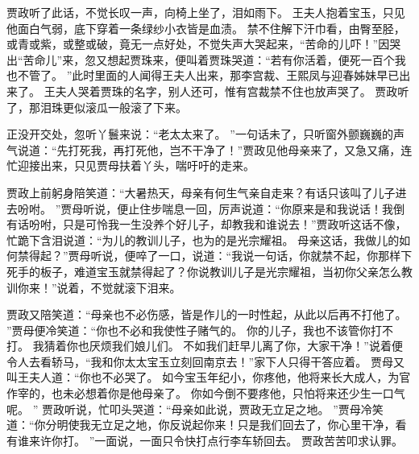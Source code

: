 贾政听了此话，不觉长叹一声，向椅上坐了，泪如雨下。
王夫人抱着宝玉，只见他面白气弱，底下穿着一条绿纱小衣皆是血渍。
禁不住解下汗巾看，由臀至胫，
或青或紫，或整或破，竟无一点好处，不觉失声大哭起来，“苦命的儿吓！”因哭出“苦命儿”来，忽又想起贾珠来，便叫着贾珠哭道：“若有你活着，便死一百个我也不管了。
”此时里面的人闻得王夫人出来，那李宫裁、王熙凤与迎春姊妹早已出来了。
王夫人哭着贾珠的名字，别人还可，惟有宫裁禁不住也放声哭了。
贾政听了，那泪珠更似滚瓜一般滚了下来。
\par
正没开交处，忽听丫鬟来说：“老太太来了。
”一句话未了，只听窗外颤巍巍的声气说道：“先打死我，再打死他，岂不干净了！”贾政见他母亲来了，又急又痛，连忙迎接出来，只见贾母扶着丫头，喘吁吁的走来。
\par
贾政上前躬身陪笑道：“大暑热天，母亲有何生气亲自走来？有话只该叫了儿子进去吩咐。
”贾母听说，便止住步喘息一回，厉声说道：“你原来是和我说话！我倒有话吩咐，只是可怜我一生没养个好儿子，却教我和谁说去！”贾政听这话不像，
忙跪下含泪说道：“为儿的教训儿子，也为的是光宗耀祖。
母亲这话，我做儿的如何禁得起？”贾母听说，便啐了一口，说道：“我说一句话，你就禁不起，你那样下死手的板子，难道宝玉就禁得起了？你说教训儿子是光宗耀祖，当初你父亲怎么教训你来！”说着，不觉就滚下泪来。
\par
贾政又陪笑道：“母亲也不必伤感，皆是作儿的一时性起，从此以后再不打他了。
”贾母便冷笑道：“你也不必和我使性子赌气的。
你的儿子，我也不该管你打不打。
我猜着你也厌烦我们娘儿们。
不如我们赶早儿离了你，大家干净！”说着便令人去看轿马，“我和你太太宝玉立刻回南京去！”家下人只得干答应着。
贾母又叫王夫人道：“你也不必哭了。
如今宝玉年纪小，你疼他，他将来长大成人，为官作宰的，也未必想着你是他母亲了。
你如今倒不要疼他，只怕将来还少生一口气呢。
”
贾政听说，忙叩头哭道：“母亲如此说，贾政无立足之地。
”贾母冷笑道：“你分明使我无立足之地，你反说起你来！只是我们回去了，你心里干净，看有谁来许你打。
”一面说，一面只令快打点行李车轿回去。
贾政苦苦叩求认罪。
\par
